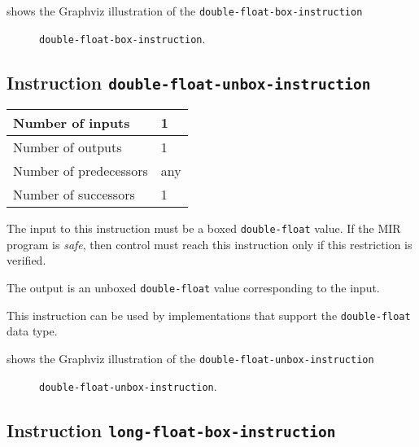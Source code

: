  shows the Graphviz illustration of the
\texttt{double-float-box-instruction}

\begin{figure}
\begin{center}
\end{center}
\caption{\label{fig-double-float-box-instruction}
\texttt{double-float-box-instruction}.}
\end{figure}

\subsection{Instruction \texttt{double-float-unbox-instruction}}
\label{mir-instruction-double-float-unbox}

\begin{tabular}{|l|l|}
\hline
Number of inputs & 1\\
\hline
Number of outputs & 1\\
\hline
Number of predecessors & any\\
\hline
Number of successors & 1\\
\hline
\end{tabular}

The input to this instruction must be a boxed \texttt{double-float}
value.  If the MIR program is \emph{safe}, then control must reach
this instruction only if this restriction is verified.

The output is an unboxed \texttt{double-float} value corresponding to
the input.

This instruction can be used by implementations that support the
\texttt{double-float} data type.   

 shows the Graphviz illustration of the
\texttt{double-float-unbox-instruction}

\begin{figure}
\begin{center}
\end{center}
\caption{\label{fig-double-float-unbox-instruction}
\texttt{double-float-unbox-instruction}.}
\end{figure}

\subsection{Instruction \texttt{long-float-box-instruction}}
\label{mir-instruction-long-float-box}

